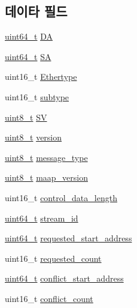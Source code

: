 \subsection*{데이타 필드}
\begin{DoxyCompactItemize}
\item 
\hyperlink{parse_8c_aec6fcb673ff035718c238c8c9d544c47}{uint64\+\_\+t} \hyperlink{struct_m_a_a_p___packet_acb85280d2eab3ae8bc045112037a565d}{DA}
\item 
\hyperlink{parse_8c_aec6fcb673ff035718c238c8c9d544c47}{uint64\+\_\+t} \hyperlink{struct_m_a_a_p___packet_a725bf85ec39adedda8b4adb109c29ded}{SA}
\item 
uint16\+\_\+t \hyperlink{struct_m_a_a_p___packet_a1a9102ebc02a8e42299ec477781088cd}{Ethertype}
\item 
uint16\+\_\+t \hyperlink{struct_m_a_a_p___packet_ac5d9ab8403fb9ca24facc32b821dd53b}{subtype}
\item 
\hyperlink{stdint_8h_aba7bc1797add20fe3efdf37ced1182c5}{uint8\+\_\+t} \hyperlink{struct_m_a_a_p___packet_a86f6b56adf7c3c38c254b7f71dce6a6c}{SV}
\item 
\hyperlink{stdint_8h_aba7bc1797add20fe3efdf37ced1182c5}{uint8\+\_\+t} \hyperlink{struct_m_a_a_p___packet_ab22abc2906422da61885ac6c8e6a1a59}{version}
\item 
\hyperlink{stdint_8h_aba7bc1797add20fe3efdf37ced1182c5}{uint8\+\_\+t} \hyperlink{struct_m_a_a_p___packet_aeaaffeace8c23899e558022f62ce6de4}{message\+\_\+type}
\item 
\hyperlink{stdint_8h_aba7bc1797add20fe3efdf37ced1182c5}{uint8\+\_\+t} \hyperlink{struct_m_a_a_p___packet_a67dab883e86b903bfbffb8e4c25829b9}{maap\+\_\+version}
\item 
uint16\+\_\+t \hyperlink{struct_m_a_a_p___packet_acc7cd70455e6e455ac498477b95f9e21}{control\+\_\+data\+\_\+length}
\item 
\hyperlink{parse_8c_aec6fcb673ff035718c238c8c9d544c47}{uint64\+\_\+t} \hyperlink{struct_m_a_a_p___packet_af5af7b461263e29ceb91a8d3a8bc2c97}{stream\+\_\+id}
\item 
\hyperlink{parse_8c_aec6fcb673ff035718c238c8c9d544c47}{uint64\+\_\+t} \hyperlink{struct_m_a_a_p___packet_a6e54c2881571f11a3a4a82c664794326}{requested\+\_\+start\+\_\+address}
\item 
uint16\+\_\+t \hyperlink{struct_m_a_a_p___packet_a3b7ca808f59412368434591249aa8a79}{requested\+\_\+count}
\item 
\hyperlink{parse_8c_aec6fcb673ff035718c238c8c9d544c47}{uint64\+\_\+t} \hyperlink{struct_m_a_a_p___packet_a75c1b7fade099765ff29a3302e3ad072}{conflict\+\_\+start\+\_\+address}
\item 
uint16\+\_\+t \hyperlink{struct_m_a_a_p___packet_a7454bb2b51c745c38822d008f1a322a1}{conflict\+\_\+count}
\end{DoxyCompactItemize}


